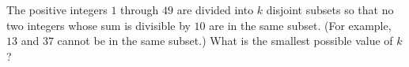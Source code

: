 The positive integers $1$ through $49$ are divided into $k$ disjoint subsets so that no two integers whose sum is divisible by $10$ are in the same subset. (For example, $13$ and $37$ cannot be in the same subset.) What is the smallest possible value of $k$?

